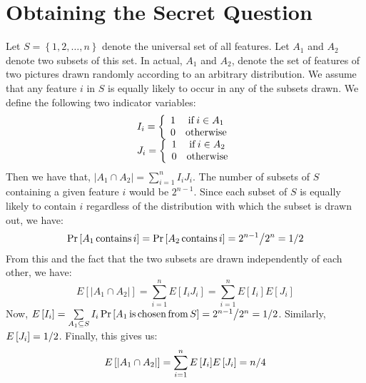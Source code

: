 \documentclass{llncs}
\begin{document}
\section{Obtaining the Secret Question}
Let $S = \left\{ {1,2, \ldots ,n} \right\}$ denote the universal set of all features. Let $A_1$ and $A_2$ denote two subsets of this set. In actual, $A_1$ and $A_2$, denote the set of features of two pictures drawn randomly according to an arbitrary distribution. We assume that any feature $i$ in $S$ is equally likely to occur in any of the subsets drawn. We define the following two indicator variables:
\[
\begin{array}{l}
 I_i  = \left\{ {\begin{array}{*{20}c}
   1 & {{\rm{if}}\,i \in A_1 }  \\
   0 & {{\rm{otherwise}}}  \\
\end{array}} \right. \\ 
 J_i  = \left\{ {\begin{array}{*{20}c}
   1 & {{\rm{if}}\,i \in A_2 }  \\
   0 & {{\rm{otherwise}}}  \\
\end{array}} \right. \\ 
 \end{array}
\]
Then we have that, $\left| {A_1  \cap A_2 } \right| = \sum\limits_{i = 1}^n {I_i J_i }$. The number of subsets of $S$ containing a given feature $i$ would be $2^{n - 1}$. Since each subset of $S$ is equally likely to contain $i$ regardless of the distribution with which the subset is drawn out, we have:
\[
\Pr \left[ {A_1 \,{\rm{contains}}\,i} \right] = \Pr \left[ {A_2 \,{\rm{contains}}\,i} \right] = {{2^{n - 1} } \mathord{\left/
 {\vphantom {{2^{n - 1} } {2^n }}} \right.
 \kern-\nulldelimiterspace} {2^n }} = {1 \mathord{\left/
 {\vphantom {1 2}} \right.
 \kern-\nulldelimiterspace} 2}
\]
From this and the fact that the two subsets are drawn independently of each other, we have:
\[
E\left[ {\left| {A_1  \cap A_2 } \right|} \right] = \sum\limits_{i = 1}^n {E\left[ {I_i J_i } \right]}  = \sum\limits_{i = 1}^n {E\left[ {I_i } \right]} E\left[ {J_i } \right] 
\]
Now, $E\left[ {I_i } \right] = \sum\limits_{A_1  \subseteq S} {I_i \Pr \left[ {A_1 \,{\rm{is}}\,{\rm{chosen}}\,{\rm{from}}\,S} \right]}  = {{2^{n - 1} } \mathord{\left/
 {\vphantom {{2^{n - 1} } {2^n }}} \right.
 \kern-\nulldelimiterspace} {2^n }} = {1 \mathord{\left/
 {\vphantom {1 2}} \right.
 \kern-\nulldelimiterspace} 2}$. Similarly, $E\left[ {J_i } \right] = {1 \mathord{\left/
 {\vphantom {1 2}} \right.
 \kern-\nulldelimiterspace} 2}$. Finally, this gives us:
\[
E\left[ {\left| {A_1  \cap A_2 } \right|} \right] = \sum\limits_{i = 1}^n {E\left[ {I_i } \right]} E\left[ {J_i } \right] = {n \mathord{\left/
 {\vphantom {n 4}} \right.
 \kern-\nulldelimiterspace} 4}
\]
\end{document}
